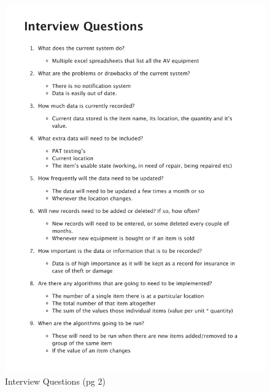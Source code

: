 \begin{figure}[H]		
    \includegraphics[page=2,width=\textwidth]{./Analysis/Interview/interview_questions.pdf}
    \caption{Interview Questions (pg 2)} \label{fig: Interview Questions}
\end{figure}		
		
